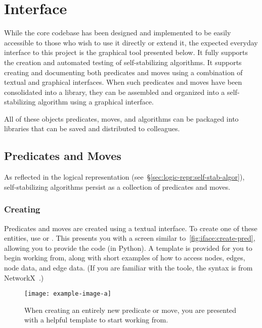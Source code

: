 \section{Interface}
\label{sec:interface-ssa}

While the core codebase has been designed and implemented
  to be easily accessible to those who wish to use it directly or extend it,
  the expected everyday interface to this project is
  the graphical tool presented below.
It fully supports the creation and automated testing of self-stabilizing algorithms.
It supports creating and documenting both predicates and moves
  using a combination of textual and graphical interfaces.
When such predicates and moves have been consolidated into a library,
  they can be assembled and organized into a self-stabilizing algorithm
  using a graphical interface.

All of these objects \Dash
  predicates, moves, and algorithms \Dash
  can be packaged into libraries that can be
  saved and distributed to colleagues.

\subsection{Predicates and Moves}
As reflected in the logical representation
  (see~\S\ref{sec:logic-repr:self-stab-algor}),
  self-stabilizing algorithms persist as a collection
  of predicates and moves.

\subsubsection{Creating}
Predicates and moves are created using a textual interface.
To create one of these entities,
  use 
   or .
This presents you with a screen similar to~\autoref{fig:iface:create-pred},
  allowing you to provide the code (in Python\autocite{python3:ref}).
A template is provided for you to begin working from,
  along with short examples of how to access nodes, edges, node data, and edge data.
(If you are familiar with the toole,
  the syntax is from NetworkX~\autocite{hagberg:networkx}.)
\begin{figure}
  \centering
  \texttt{[image: example-image-a]}
  \caption{When creating an entirely new predicate or move,
    you are presented with a helpful template to start working from.}
  \label{fig:iface:create-pred}
\end{figure}

